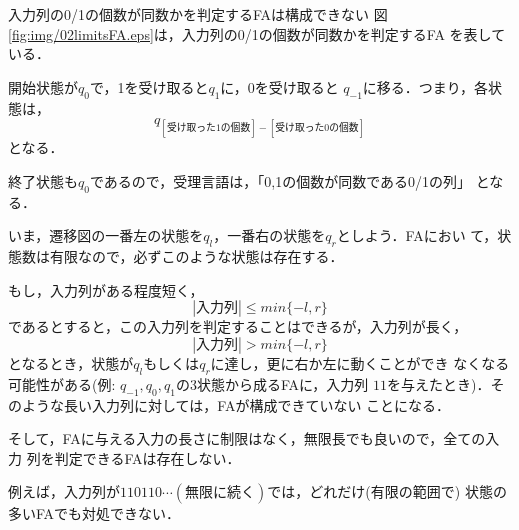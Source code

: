 \begin{myexample}{入力列の0/1の個数が同数かを判定するFAは構成できない} 
 図\ref{fig:img/02limitsFA.eps}は，入力列の0/1の個数が同数かを判定するFA
 を表している．

 開始状態が$q_0$で，1を受け取ると$q_1$に，0を受け取ると
 $q_{-1}$に移る．つまり，各状態は，
 \[
  q_{[受け取った1の個数] - [受け取った0の個数]}
 \]
 となる．

 終了状態も$q_0$であるので，受理言語は，「0,1の個数が同数である0/1の列」
 となる．

いま，遷移図の一番左の状態を$q_l$，一番右の状態を$q_r$としよう．FAにおい
 て，状態数は有限なので，必ずこのような状態は存在する．

もし，入力列がある程度短く，
 \[
  |入力列| \leq min\{-l, r\}
 \]
 であるとすると，この入力列を判定することはできるが，入力列が長く，
 \[
  |入力列| > min\{-l, r\}
 \]
 となるとき，状態が$q_l$もしくは$q_r$に達し，更に右か左に動くことができ
 なくなる可能性がある(例: $q_{-1}, q_0, q_1$の3状態から成るFAに，入力列
 $11$を与えたとき)．そのような長い入力列に対しては，FAが構成できていない
 ことになる．

そして，FAに与える入力の長さに制限はなく，無限長でも良いので，全ての入力
 列を判定できるFAは存在しない．

 例えば，入力列が$110110\cdots (無限に続く)$では，どれだけ(有限の範囲で)
 状態の多いFAでも対処できない．
\end{myexample}

